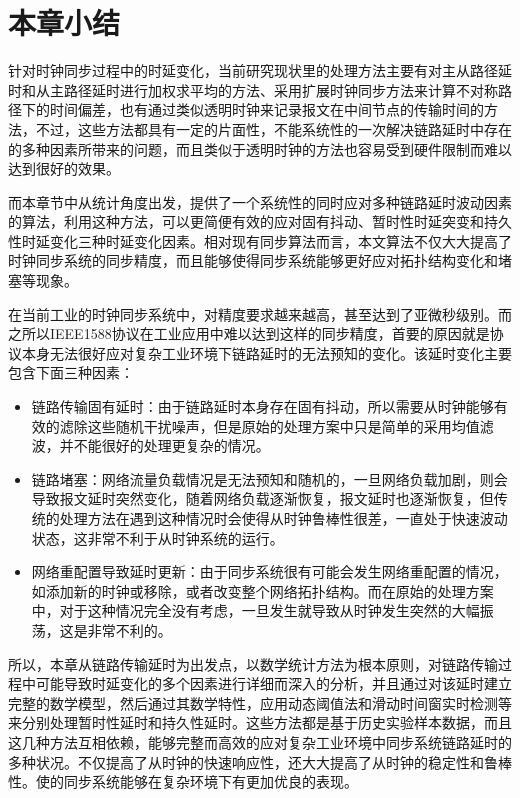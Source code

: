 \section{本章小结}
针对时钟同步过程中的时延变化，当前研究现状里的处理方法主要有对主从路径延时和从主路径延时进行加权求平均的方法、采用扩展时钟同步方法来计算不对称路径下的时间偏差，也有通过类似透明时钟来记录报文在中间节点的传输时间的方法，不过，这些方法都具有一定的片面性，不能系统性的一次解决链路延时中存在的多种因素所带来的问题，而且类似于透明时钟的方法也容易受到硬件限制而难以达到很好的效果。

而本章节中从统计角度出发，提供了一个系统性的同时应对多种链路延时波动因素的算法，利用这种方法，可以更简便有效的应对固有抖动、暂时性时延突变和持久性时延变化三种时延变化因素。相对现有同步算法而言，本文算法不仅大大提高了时钟同步系统的同步精度，而且能够使得同步系统能够更好应对拓扑结构变化和堵塞等现象。

在当前工业的时钟同步系统中，对精度要求越来越高，甚至达到了亚微秒级别。而之所以IEEE1588协议在工业应用中难以达到这样的同步精度，首要的原因就是协议本身无法很好应对复杂工业环境下链路延时的无法预知的变化。该延时变化主要包含下面三种因素：
\begin{itemize}[noitemsep,topsep=0pt,parsep=0pt,partopsep=0pt]
	\item 链路传输固有延时：由于链路延时本身存在固有抖动，所以需要从时钟能够有效的滤除这些随机干扰噪声，但是原始的处理方案中只是简单的采用均值滤波，并不能很好的处理更复杂的情况。
	\item 链路堵塞：网络流量负载情况是无法预知和随机的，一旦网络负载加剧，则会导致报文延时突然变化，随着网络负载逐渐恢复，报文延时也逐渐恢复，但传统的处理方法在遇到这种情况时会使得从时钟鲁棒性很差，一直处于快速波动状态，这非常不利于从时钟系统的运行。
	\item 网络重配置导致延时更新：由于同步系统很有可能会发生网络重配置的情况，如添加新的时钟或移除，或者改变整个网络拓扑结构。而在原始的处理方案中，对于这种情况完全没有考虑，一旦发生就导致从时钟发生突然的大幅振荡，这是非常不利的。
\end{itemize}

所以，本章从链路传输延时为出发点，以数学统计方法为根本原则，对链路传输过程中可能导致时延变化的多个因素进行详细而深入的分析，并且通过对该延时建立完整的数学模型，然后通过其数学特性，应用动态阈值法和滑动时间窗实时检测等来分别处理暂时性延时和持久性延时。这些方法都是基于历史实验样本数据，而且这几种方法互相依赖，能够完整而高效的应对复杂工业环境中同步系统链路延时的多种状况。不仅提高了从时钟的快速响应性，还大大提高了从时钟的稳定性和鲁棒性。使的同步系统能够在复杂环境下有更加优良的表现。





